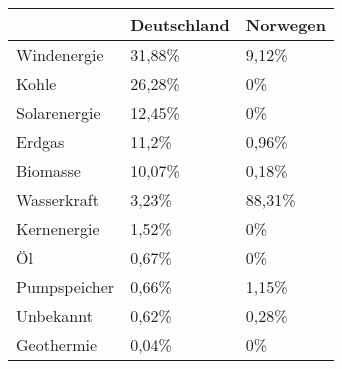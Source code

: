 \begin{tabular}{|p{4cm}|p{4cm}|p{4cm}|}
    \hline
    & Deutschland & Norwegen \\
    \hline
    \hline
    Windenergie & \cellcolor{High}31,88\% & \cellcolor{Medium}9,12\% \\
    \hline
    Kohle & \cellcolor{Medium}26,28\% & \cellcolor{Low}0\% \\
    \hline
    Solarenergie & \cellcolor{Medium}12,45\% & \cellcolor{Low}0\% \\
    \hline
    Erdgas & \cellcolor{Medium}11,2\% & \cellcolor{Medium}0,96\% \\
    \hline
    Biomasse & \cellcolor{Medium}10,07\% & \cellcolor{Low}0,18\% \\
    \hline
    Wasserkraft & \cellcolor{Medium}3,23\% & \cellcolor{High}88,31\% \\
    \hline
    Kernenergie & \cellcolor{Low}1,52\% & \cellcolor{Low}0\% \\
    \hline
    Öl & \cellcolor{Low}0,67\% & \cellcolor{Low}0\% \\
    \hline
    Pumpspeicher & \cellcolor{Low}0,66\% & \cellcolor{Low}1,15\% \\
    \hline
    Unbekannt & \cellcolor{Low}0,62\% & \cellcolor{Low}0,28\% \\
    \hline
    Geothermie & \cellcolor{Low}0,04\% & \cellcolor{Low}0\% \\
    \hline
\end{tabular}
